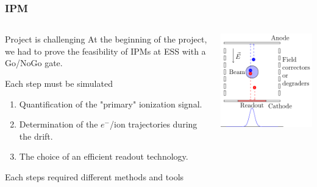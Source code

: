 \begin{frame}
  \frametitle{IPM}
  \begin{columns}
    \begin{column}{0.45\textwidth}
      \begin{alertblock}{Project is challenging}
        At the beginning of the project, we had to prove the feasibility of IPMs at ESS with a Go/NoGo gate.
      \end{alertblock}
      \begin{block}{Each step must be simulated}
        \begin{enumerate}
          \item Quantification of the "primary" ionization signal.
          \item Determination of the $e^-$/ion trajectories during the drift.
          \item The choice of an efficient readout technology.
        \end{enumerate}
      \end{block}
      Each steps required different methods and tools
    \end{column}
    \begin{column}{0.45\textwidth}
      \includegraphics[width=\textwidth]{02_ESS/fig/fig000_IPM.pdf}
    \end{column}
  \end{columns}
\end{frame}


